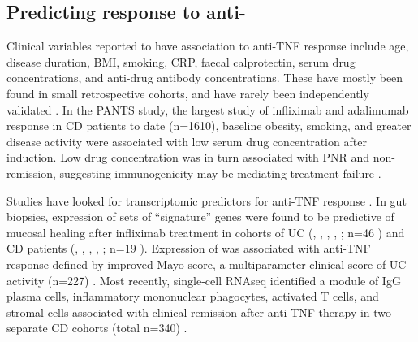 \subsection{Predicting response to anti-}
\label{subsec:multiPANTS_intro_predicting_response}

Clinical variables reported to have association to anti-\gls{TNF} response include age, disease duration, \gls{BMI}, smoking, \gls{CRP}, faecal calprotectin, serum drug concentrations, and anti-drug antibody concentrations.
These have mostly been found in small retrospective cohorts, and have rarely been independently validated \autocite{dhaens2011LondonPositionStatement,ding2016SystematicReviewPredicting,kopylov2016PredictingDurableResponse,flamant2018InflammatoryBowelDisease,digby-bell2019InterrogatingHostImmunity,noor2020PersonalisedMedicineCrohn}.
In the \gls{PANTS} study, the largest study of infliximab and adalimumab response in \gls{CD} patients to date (n=1610),
baseline obesity, smoking, and greater disease activity were associated with low serum drug concentration after induction.
Low drug concentration was in turn associated with \gls{PNR} and non-remission, suggesting immunogenicity may be mediating treatment failure \autocite{kennedy2019PredictorsAntiTNFTreatment}.

Studies have looked for transcriptomic predictors for anti-\gls{TNF} response \autocite{digby-bell2019InterrogatingHostImmunity,noor2020PersonalisedMedicineCrohn}.
In gut biopsies, expression of sets of \enquote{signature} genes were found to be predictive of mucosal healing after infliximab treatment in cohorts of 
\gls{UC} (, , , , ; n=46 \autocite{arijs2009MucosalGeneSignatures}) 
and \gls{CD} patients (, , , , ; n=19 \autocite{arijs2010PredictiveValueEpithelial}).
Expression of  was associated with anti-\gls{TNF} response defined by improved Mayo score, a multiparameter clinical score of \gls{UC} activity (n=227) \autocite{west2017OncostatinDrivesIntestinal}.
Most recently, single-cell \gls{RNAseq} identified a module of IgG plasma cells, inflammatory mononuclear phagocytes, activated T cells, and stromal cells associated with clinical remission after anti-\gls{TNF} therapy in two separate \gls{CD} cohorts (total n=340) \autocite{martin2019SingleCellAnalysisCrohn}.

